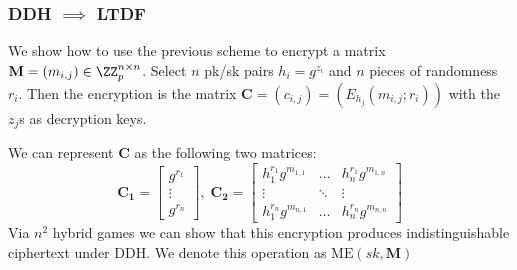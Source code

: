 \documentclass{beamer}
\begin{document}
\begin{frame}
    \frametitle{DDH $\implies$ LTDF}
    We show how to use the previous scheme to encrypt a matrix $\mathbf{M} = (m_{i, j}) \in \ZZ_p^{n \times n}$.
    Select $n$ pk/sk pairs $h_i = g^{z_i}$ and $n$ pieces of randomness $r_i$.
    Then the encryption is the matrix $\mathbf{C} = (c_{i,j}) = (E_{h_j}(m_{i,j}; r_i))$ with the $z_j$s as decryption keys.

    We can represent $\mathbf{C}$ as the following two matrices:
    \[ \mathbf{C_1} = \begin{bmatrix}
            g^{r_1} \\
            \vdots  \\
            g^{r_n}
        \end{bmatrix}, \;
        \mathbf{C_2} = \begin{bmatrix}
            h_1^{r_1} g^{m_{1,1}}  & \dots  & h_n^{r_1} g^{m_{1,n}}  \\
            \vdots                 & \ddots & \vdots                 \\
            h_1^{r_n} g^{m_{n, 1}} & \dots  & h_n^{r_n} g^{m_{n, n}}
        \end{bmatrix}\]
    Via $n^2$ hybrid games we can show that this encryption produces indistinguishable
    ciphertext under DDH. We denote this operation as $\mathrm{ME}(sk, \mathbf{M})$
\end{frame}
\end{document}

